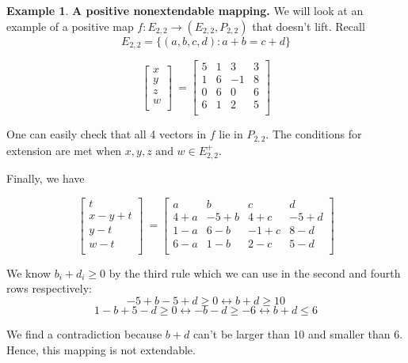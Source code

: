 \documentclass[11pt]{amsart}
\theoremstyle{definition}
\newtheorem{example}[thm]{Example}
\begin{document}
\begin{example}
    \textbf{A positive nonextendable mapping.} We will look at an example of a positive map $f: E_{2,2} \to (E_{2,2}, P_{2,2})$ that doesn't lift. Recall
\[
E_{2,2} = \{(a,b,c,d) : a+b = c+d\}
\]

\[
\begin{bmatrix}
x \\
y \\
z \\
w \\
\end{bmatrix}\ = \begin{bmatrix}
5 & 1 & 3 & 3 \\
1 & 6 & -1 & 8 \\
0 & 6 & 0 & 6 \\
6 & 1 & 2 & 5 \\
\end{bmatrix}
\]

One can easily check that all 4 vectors in $f$ lie in $P_{2,2}$. The conditions for extension are met when $x,y,z \text{ and } w \in E_{2,2}^+$. 

Finally, we have

\[
\begin{bmatrix}
t \\
x - y + t \\
y - t \\
w - t \\
\end{bmatrix}\ = \begin{bmatrix}
a & b & c & d \\
4+a & -5+b & 4+c & -5+d \\
1-a & 6-b & -1+c & 8-d \\
6-a & 1-b & 2-c & 5-d \\
\end{bmatrix}
\]

We know $b_i + d_i \geq 0$ by the third rule which we can use in the second and fourth rows respectively:
\[
-5 + b - 5 + d \geq 0 \leftrightarrow b + d \geq 10
\]
\[
1 - b + 5 - d \geq 0 \leftrightarrow -b - d \geq -6 \leftrightarrow b + d \leq 6
\]

We find a contradiction because $b+d$ can't be larger than 10 and smaller than 6. Hence, this mapping is not extendable.
\end{example}
\end{document}
